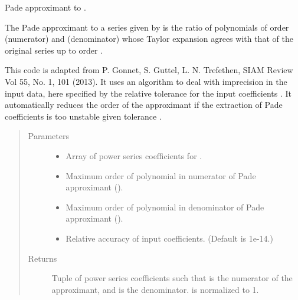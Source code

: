 \documentclass[letterpaper,10pt,english]{sphinxmanual}
\begin{document}
\begin{fulllineitems}
\label{\detokenize{g2tools:g2tools.pade_svd}}
\sphinxcode{{[}m,n{]}} Pade approximant to .

The \sphinxcode{{[}m,n{]}} Pade approximant to a series given by
 is the ratio of  polynomials of order 
(numerator) and  (denominator) whose  Taylor expansion agrees
with that of the original series up to order .

This code is adapted from P. Gonnet,  S. Guttel, L. N. Trefethen, SIAM
Review Vol 55, No. 1, 101 (2013). It uses an  algorithm to deal with
imprecision in the input data,  here specified by the relative tolerance
 for the  input coefficients . It automatically reduces
the order of the approximant if the extraction of Pade coefficients
is too unstable given tolerance .
\begin{quote}\begin{description}
\item[{Parameters}] \leavevmode\begin{itemize}
\item {} 
 \textendash{} Array  of power series coefficients for .

\item {} 
 \textendash{} Maximum order of polynomial in numerator of Pade
approximant ().

\item {} 
 \textendash{} Maximum order of polynomial in denominator of Pade
approximant ().

\item {} 
 \textendash{} Relative accuracy of input coefficients. (Default is 1e-14.)

\end{itemize}

\item[{Returns}] \leavevmode
Tuple of power series coefficients  such that
 is the numerator of the approximant,
and  is the denominator.  is
normalized to 1.

\end{description}\end{quote}

\end{fulllineitems}
\end{document}
